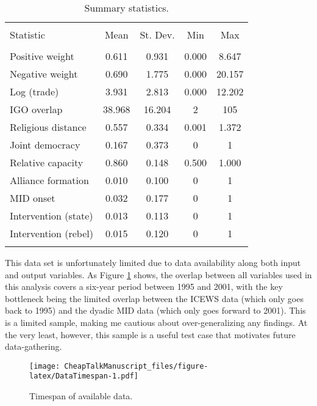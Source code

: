 \documentclass[10pt,]{article}
\begin{document}
\begin{table}[!htbp] \centering 
  \caption{\label{tab:SummaryStats}Summary statistics.} 
  \label{} 
\begin{tabular}{@{\extracolsep{5pt}}lcccc} 
\\[-1.8ex]\hline 
\hline \\[-1.8ex] 
Statistic & \multicolumn{1}{c}{Mean} & \multicolumn{1}{c}{St. Dev.} & \multicolumn{1}{c}{Min} & \multicolumn{1}{c}{Max} \\ 
\hline \\[-1.8ex] 
Positive weight & 0.611 & 0.931 & 0.000 & 8.647 \\ 
Negative weight & 0.690 & 1.775 & 0.000 & 20.157 \\ 
Log (trade) & 3.931 & 2.813 & 0.000 & 12.202 \\ 
IGO overlap & 38.968 & 16.204 & 2 & 105 \\ 
Religious distance & 0.557 & 0.334 & 0.001 & 1.372 \\ 
Joint democracy & 0.167 & 0.373 & 0 & 1 \\ 
Relative capacity & 0.860 & 0.148 & 0.500 & 1.000 \\ 
Alliance formation & 0.010 & 0.100 & 0 & 1 \\ 
MID onset & 0.032 & 0.177 & 0 & 1 \\ 
Intervention (state) & 0.013 & 0.113 & 0 & 1 \\ 
Intervention (rebel) & 0.015 & 0.120 & 0 & 1 \\ 
\hline \\[-1.8ex] 
\end{tabular} 
\end{table}

This data set is unfortunately limited due to data availability along
both input and output variables. As Figure \ref{fig:DataTimespan} shows,
the overlap between all variables used in this analysis covers a
six-year period between 1995 and 2001, with the key bottleneck being the
limited overlap between the ICEWS data (which only goes back to 1995)
and the dyadic MID data (which only goes forward to 2001). This is a
limited sample, making me cautious about over-generalizing any findings.
At the very least, however, this sample is a useful test case that
motivates future data-gathering.

\begin{figure}[htbp]
\centering
\texttt{[image: CheapTalkManuscript\_files/figure-latex/DataTimespan-1.pdf]}
\caption{\label{fig:DataTimespan}Timespan of available data.}
\end{figure}
\end{document}
